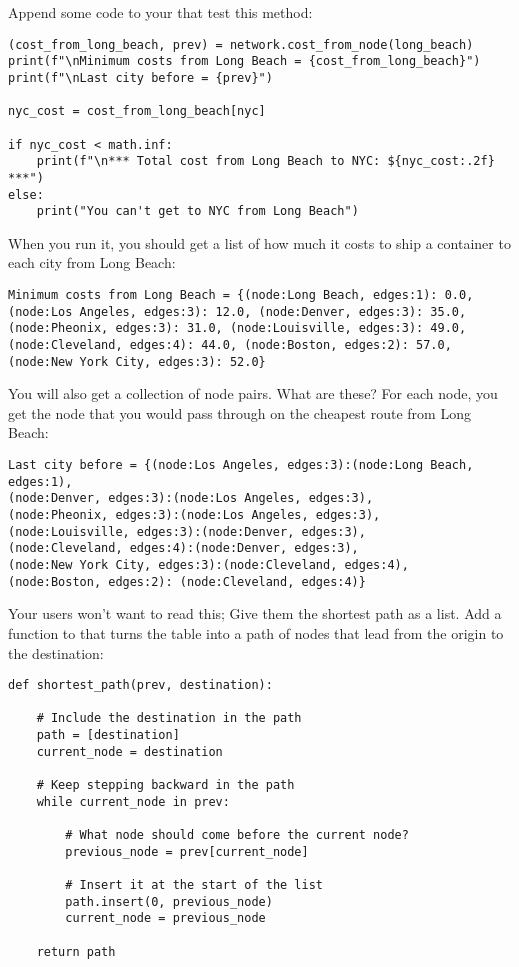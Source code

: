 Append some code to your  that test this method:

\begin{verbatim}
(cost_from_long_beach, prev) = network.cost_from_node(long_beach)
print(f"\nMinimum costs from Long Beach = {cost_from_long_beach}")
print(f"\nLast city before = {prev}")

nyc_cost = cost_from_long_beach[nyc]

if nyc_cost < math.inf:
    print(f"\n*** Total cost from Long Beach to NYC: ${nyc_cost:.2f} ***")
else:
    print("You can't get to NYC from Long Beach")
\end{verbatim}

When you run it, you should get a list of how much it costs to ship a
container to each city from Long Beach:
\begin{verbatim}
Minimum costs from Long Beach = {(node:Long Beach, edges:1): 0.0,
(node:Los Angeles, edges:3): 12.0, (node:Denver, edges:3): 35.0,
(node:Pheonix, edges:3): 31.0, (node:Louisville, edges:3): 49.0,
(node:Cleveland, edges:4): 44.0, (node:Boston, edges:2): 57.0,
(node:New York City, edges:3): 52.0}
\end{verbatim}

You will also get a collection of node pairs. What are these? For each
node, you get the node that you would pass through on the cheapest
route from Long Beach:
\begin{verbatim}
Last city before = {(node:Los Angeles, edges:3):(node:Long Beach, edges:1),
(node:Denver, edges:3):(node:Los Angeles, edges:3),
(node:Pheonix, edges:3):(node:Los Angeles, edges:3),
(node:Louisville, edges:3):(node:Denver, edges:3),
(node:Cleveland, edges:4):(node:Denver, edges:3),
(node:New York City, edges:3):(node:Cleveland, edges:4),
(node:Boston, edges:2): (node:Cleveland, edges:4)}
\end{verbatim}

Your users won't want to read this; Give them the shortest path as a list.  Add a function to
 that turns the  table into a path of
nodes that lead from the origin to the destination:

\begin{verbatim}
def shortest_path(prev, destination):

    # Include the destination in the path
    path = [destination]
    current_node = destination

    # Keep stepping backward in the path
    while current_node in prev:

        # What node should come before the current node?
        previous_node = prev[current_node]

        # Insert it at the start of the list
        path.insert(0, previous_node)
        current_node = previous_node

    return path
\end{verbatim}

